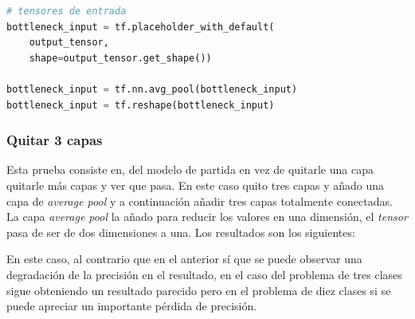 \documentclass[12pt,a4paper]{article}
\begin{document}
\begin{lstlisting}[language=Python]
# tensores de entrada
bottleneck_input = tf.placeholder_with_default(
    output_tensor,
    shape=output_tensor.get_shape())

bottleneck_input = tf.nn.avg_pool(bottleneck_input)
bottleneck_input = tf.reshape(bottleneck_input)
\end{lstlisting}


\subsubsection{Quitar 3 capas}
Esta prueba consiste en, del modelo de partida en vez de quitarle una capa quitarle más capas y ver que pasa. En este caso quito tres capas y añado una capa de \textit{average pool} y a continuación añadir tres capas totalmente conectadas. La capa \textit{average pool} la añado para reducir los valores en una dimensión, el \textit{tensor} pasa de ser de dos dimensiones a una. Los resultados son los siguientes:

\begin{table}[H]
\centering
{}
\caption{Resultados quitar 3 capas.}
\end{table}

En este caso, al contrario que en el anterior sí que se puede observar una degradación de la precisión en el resultado, en el caso del problema de tres clases sigue obteniendo un resultado parecido pero en el problema de diez clases si se puede apreciar un importante pérdida de precisión.
\bigskip
\end{document}
